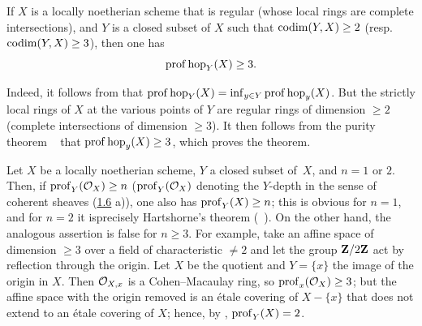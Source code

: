 \begin{theoreme} \label{XIV.1.11}
If $X$ is a locally noetherian scheme that is regular (\resp whose local rings are complete intersections), and $Y$ is a closed subset of $X$ such that $\operatorname{codim}(Y, X)\geq 2$ (resp.\ \hbox{$\operatorname{codim}(Y, X)\geq3$}), then one has
$$
\operatorname{prof} \operatorname{hop}_Y(X)\geq 3.
$$
\end{theoreme}

Indeed, it follows from  that $\operatorname{prof} \operatorname{hop}_Y(X)=\inf_{y\in Y} \operatorname{prof} \operatorname{hop}_y(X)$. But the strictly local rings of $X$ at the various points of $Y$ are regular rings of dimension $\geq 2$ (\resp complete intersections of dimension $\geq 3$). It then follows from the purity theorem ~ that $\operatorname{prof} \operatorname{hop}_y(X)\geq 3$, which proves the theorem.

\begin{exemple} \label{XIV.1.12}
Let $X$ be a locally noetherian scheme, $Y$ a closed subset of~$X$, and $n=1$ or $2$. Then, if $\operatorname{prof}_Y(\mathcal O_X)\geq n$ ($\operatorname{prof}_Y(\mathcal O_X)$ denoting the $Y$-depth in the sense of coherent sheaves (\cf \hyperref[XIV.1.6]{1.6} a)), one also has $\operatorname{prof}_Y(X)\geq n$; this is obvious for $n=1$, and for $n=2$ it is\pageoriginale precisely Hartshorne's theorem (~). On the other hand, the analogous assertion is false for $n\geq 3$. For example, take an affine space of dimension $\geq 3$ over a field of characteristic $\neq 2$ and let the group $\mathbf Z/2\mathbf Z$ act by reflection through the origin. Let $X$ be the quotient and $Y=\{x\}$ the image of the origin in $X$. Then $\mathcal O_{X, x}$ is a Cohen--Macaulay ring, so $\operatorname{prof}_x(\mathcal O_X)\geq 3$; but the affine space with the origin removed is an \'{e}tale covering of $X-\{x\}$ that does not extend to an \'{e}tale covering of $X$; hence, by , $\operatorname{prof}_Y(X)=2$.
\end{exemple}

